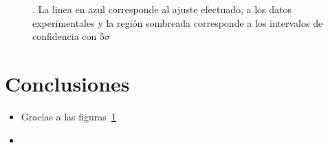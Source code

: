 \documentclass[%
 reprint,
 amsmath,amssymb,
 aps,
]{revtex4-1}
\begin{document}
\begin{figure}[h]
\caption{\label{movilidad de Hall}.  La linea en azul corresponde al ajuste efectuado, a los datos experimentales y la región sombreada corresponde a los intervalos de confidencia con $5\sigma$}
\end{figure}

\section{Conclusiones}
\begin{itemize}
    \item Gracias a las figuras~\ref{}
    \item 
\end{itemize}
\end{document}
